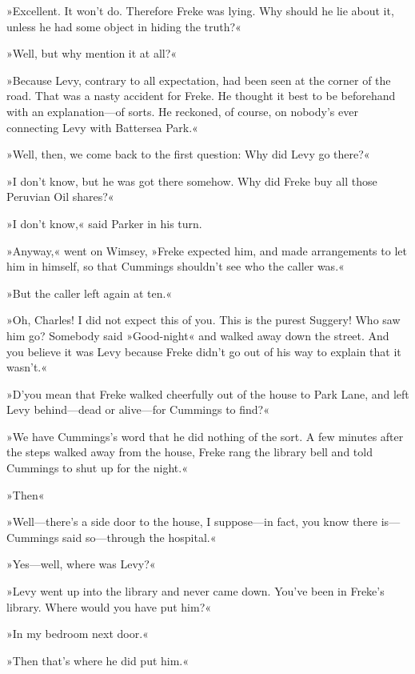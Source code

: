 »Excellent. It won't do. Therefore Freke was lying. Why should he lie about it, unless he had some object in hiding the truth?«

»Well, but why mention it at all?«

»Because Levy, contrary to all expectation, had been seen at the corner of the road. That was a nasty accident for Freke. He thought it best to be beforehand with an explanation\allowbreak---\allowbreak of sorts. He reckoned, of course, on nobody's ever connecting Levy with Battersea Park.«

»Well, then, we come back to the first question: Why did Levy go there?«

»I don't know, but he was got there somehow. Why did Freke buy all those Peruvian Oil shares?«

»I don't know,« said Parker in his turn.

»Anyway,« went on Wimsey, »Freke expected him, and made arrangements to let him in himself, so that Cummings shouldn't see who the caller was.«

»But the caller left again at ten.«

»Oh, Charles! I did not expect this of you. This is the purest Suggery! Who saw him go? Somebody said »Good-night« and walked away down the street. And you believe it was Levy because Freke didn't go out of his way to explain that it wasn't.«

»D'you mean that Freke walked cheerfully out of the house to Park Lane, and left Levy behind\allowbreak---\allowbreak dead or alive\allowbreak---\allowbreak for Cummings to find?«

»We have Cummings's word that he did nothing of the sort. A few minutes after the steps walked away from the house, Freke rang the library bell and told Cummings to shut up for the night.«

»Then\longdash«

»Well\allowbreak---\allowbreak there's a side door to the house, I suppose\allowbreak---\allowbreak in fact, you know there is\allowbreak---\allowbreak Cummings said so\allowbreak---\allowbreak through the hospital.«

»Yes\allowbreak---\allowbreak well, where was Levy?«

»Levy went up into the library and never came down. You've been in Freke's library. Where would you have put him?«

»In my bedroom next door.«

»Then that's where he did put him.«

